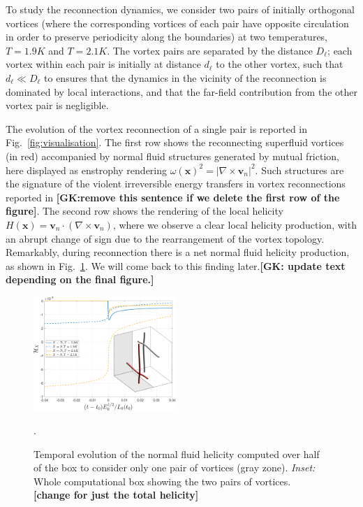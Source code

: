 \documentclass[%
 reprint,
 amsmath,amssymb,
 aps,
 prl,
]{revtex4-2}
\def \v{\mathbf{v}}
\def \x{\mathbf{x}}
\newcommand*{\NOTE}[1]{\textbf{\color{red}[#1]}}
\begin{document}
{To study the reconnection dynamics, we consider two pairs of initially orthogonal vortices (where the corresponding vortices of each pair have opposite circulation in order to preserve periodicity along the boundaries)
at two temperatures, $T=1.9K$ and $T=2.1K$. The vortex pairs are separated by the distance $D_{\ell}$; each vortex within each pair is initially at distance $d_{\ell}$ to the other vortex, such that $d_{\ell}\ll D_{\ell}$ to ensures that the dynamics in the vicinity of the reconnection is dominated by local interactions, and that the far-field contribution from the other vortex pair is negligible.

The evolution of the vortex reconnection of a single pair is reported in Fig.~\ref{fig:visualisation}. 
The first row shows the reconnecting superfluid vortices (in red) accompanied by normal fluid structures generated by mutual friction, here displayed as enstrophy rendering $\omega(\x)^2=|\nabla\times \v_n|^2$. Such structures are the signature of the violent irreversible energy transfers in vortex reconnections reported in \cite{stasiak2024quantum} \NOTE{GK:remove this sentence if we delete the first row of the figure}. The second row shows the rendering of the local helicity $H(\x)=\v_n\cdot(\nabla\times \v_n )$, where we observe a clear local helicity production, with an abrupt change of sign due to the rearrangement of the vortex topology. Remarkably, during reconnection there is a net normal fluid helicity production, as shown in Fig.~\ref{fig:total-helicity}. We will come back to this finding later.\NOTE{GK: update text depending on the final figure.}
\begin{figure}[t]
    \centering
    \includegraphics*[width=0.48\textwidth]{total_helicity_tubes}
\caption{Temporal evolution of the normal fluid helicity computed over half of the box to consider only one pair of vortices (gray zone). 
\emph{Inset:} Whole computational box showing the two pairs of vortices. \NOTE{change for just the total helicity}}.
\label{fig:total-helicity}
\end{figure}

}
\end{document}
